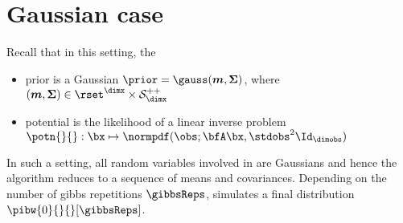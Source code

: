 \section{Gaussian case}

\def\cov{\mathbf{\Sigma}}
\def\mean{\boldsymbol{m}}
\def\likelihood{\bfA}
\def\covBridge{\sigma^2}
\def\meanConditional{\hat{\mean}}
\def\potBias{\boldsymbol{a}}
\def\potLikelihood{\hat{\likelihood}}
\def\covPosterior{\mathbf{\Gamma}}
\def\matrixXk{\mathbf{M}}
\def\bfM{\mathbf{M}}
\def\hpimean{\hat{\boldsymbol{\mu}}}
\def\bfH{\mathbf{H}}
\def\bc{\boldsymbol{c}}

\def\LH{\mathbf{H}}
\def\Lbias{\boldsymbol{h}}
\def\Lcov{\mathbf{L}}

\def\LHbefore{\underline{\mathbf{H}}}
\def\Lbiasbefore{\underline{\boldsymbol{h}}}
\def\Lcovbefore{\underline{\mathbf{L}}}


\def\pizero{\mathbf{M}}
\def\pik{\mathbf{N}}
\def\picov{\mathbf{\Lambda}}
\def\pibias{\boldsymbol{e}}


\def\covtau{\mathbf{\Sigma}_{\bx}}
\def\meantau{\boldsymbol{\mu}_{\bx}}

\def\matzero{\mathbf{C}}
\def\biaszero{\boldsymbol{c}}
\def\covzero{\mathbf{\Sigma}_{c}}

\def\matk{\mathbf{D}}
\def\biask{\boldsymbol{d}}
\def\covk{\mathbf{\Sigma}_{d}}

\def\covthree{\mathbf{\Psi}}
\def\centeredxzero{\bar{\bx}_0'}
\def\centeredxk{\bar{\bx}_k'}


\renewcommand{\hpotn}[2]{\ifthenelse{\equal{#2}{}}{\hat{g} _{#1}}{\hat{g} _{#1}(#2)}}

Recall that in this setting, the
\begin{itemize}
    \item prior is a Gaussian $\prior = \gauss(\mean, \cov)$, where $(\mean, \cov) \in \rset^\dimx \times \mathcal{S}^{++} _\dimx$
    \item potential is the likelihood of a linear inverse problem $\potn{}{}: \bx \mapsto \normpdf(\obs; \bfA \bx, \stdobs^2 \Id_\dimobs)$
\end{itemize}
In such a setting, all random variables involved in  are Gaussians and hence the algorithm reduces to a sequence of means and covariances.
Depending on the number of gibbs repetitions $\gibbsReps$,  simulates a final distribution $\pibw{0}{}{}[\gibbsReps]$.


